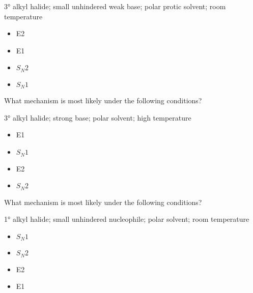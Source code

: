 \documentclass[12pt,a4paper]{article}
\begin{document}
\begin{enumerate}
{    \ang{3} alkyl halide; small unhindered weak base; polar protic solvent; room temperature
        \begin{itemize}
            \item E2
            \item E1
            \item \(S_N2\)
            \item {\color{o-Sun}\(S_N1\)}
        \end{itemize}
    \item What mechanism is most likely under the following conditions? 

    \ang{3} alkyl halide; strong base; polar solvent; high temperature
    
        \begin{itemize}
            \item E1
            \item \(S_N1\)
            \item {\color{o-Sun}E2}
            \item \(S_N2\)
        \end{itemize}
    \item What mechanism is most likely under the following conditions? 

    \ang{1} alkyl halide; small unhindered nucleophile; polar solvent; room temperature
        \begin{itemize}
            \item \(S_N1\)
            \item {\color{o-Sun}\(S_N2\)}
            \item E2
            \item E1
        \end{itemize}
    }
\end{enumerate}
\end{document}
